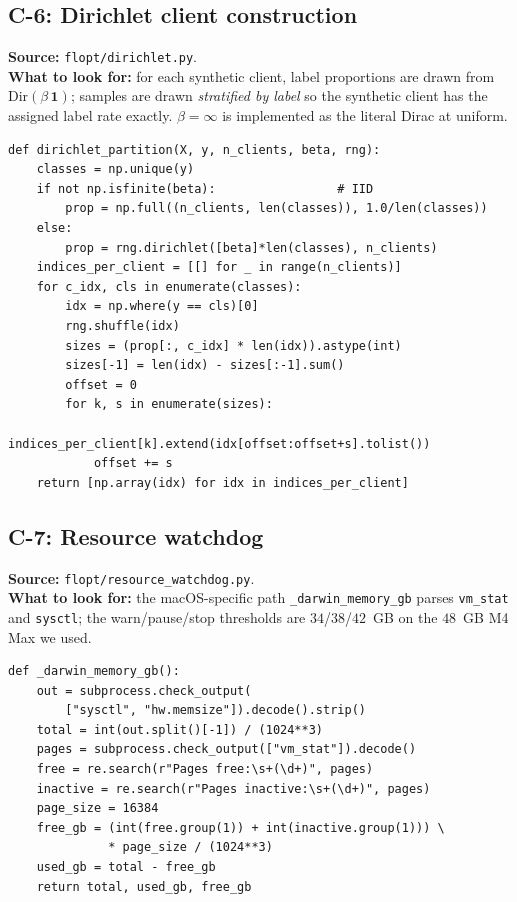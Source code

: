 \subsection{C-6: Dirichlet client construction}
\textbf{Source:} \texttt{flopt/dirichlet.py}.\\
\textbf{What to look for:} for each synthetic client, label
proportions are drawn from $\mathrm{Dir}(\beta\,\mathbf{1})$;
samples are drawn \emph{stratified by label} so the synthetic
client has the assigned label rate exactly. $\beta\!=\!\infty$ is
implemented as the literal Dirac at uniform.

\begin{lstlisting}
def dirichlet_partition(X, y, n_clients, beta, rng):
    classes = np.unique(y)
    if not np.isfinite(beta):                 # IID
        prop = np.full((n_clients, len(classes)), 1.0/len(classes))
    else:
        prop = rng.dirichlet([beta]*len(classes), n_clients)
    indices_per_client = [[] for _ in range(n_clients)]
    for c_idx, cls in enumerate(classes):
        idx = np.where(y == cls)[0]
        rng.shuffle(idx)
        sizes = (prop[:, c_idx] * len(idx)).astype(int)
        sizes[-1] = len(idx) - sizes[:-1].sum()
        offset = 0
        for k, s in enumerate(sizes):
            indices_per_client[k].extend(idx[offset:offset+s].tolist())
            offset += s
    return [np.array(idx) for idx in indices_per_client]
\end{lstlisting}

\subsection{C-7: Resource watchdog}
\textbf{Source:} \texttt{flopt/resource\_watchdog.py}.\\
\textbf{What to look for:} the macOS-specific path
\texttt{\_darwin\_memory\_gb} parses \texttt{vm\_stat} and
\texttt{sysctl}; the warn/pause/stop thresholds are
$34$/$38$/$42$~GB on the $48$~GB M4 Max we used.

\begin{lstlisting}
def _darwin_memory_gb():
    out = subprocess.check_output(
        ["sysctl", "hw.memsize"]).decode().strip()
    total = int(out.split()[-1]) / (1024**3)
    pages = subprocess.check_output(["vm_stat"]).decode()
    free = re.search(r"Pages free:\s+(\d+)", pages)
    inactive = re.search(r"Pages inactive:\s+(\d+)", pages)
    page_size = 16384
    free_gb = (int(free.group(1)) + int(inactive.group(1))) \
              * page_size / (1024**3)
    used_gb = total - free_gb
    return total, used_gb, free_gb
\end{lstlisting}

